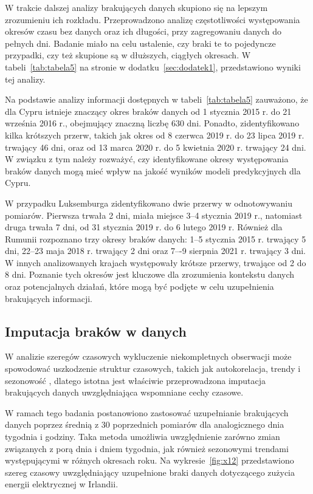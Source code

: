 \documentclass[polish, twoside, 12pt, a4paper]{article}
\theoremstyle{definition}
\theoremstyle{plain}
\theoremstyle{remark}
\begin{document}
W trakcie dalszej analizy brakujących danych skupiono się na lepszym zrozumieniu ich rozkładu. Przeprowadzono analizę częstotliwości występowania okresów czasu bez danych oraz ich długości, przy zagregowaniu danych do pełnych dni. Badanie miało na celu ustalenie, czy braki te to pojedyncze przypadki, czy też skupione są w dłuższych, ciągłych okresach. W tabeli~\ref{tab:tabela5} na stronie \pageref{tab:tabela5} w dodatku~\ref{sec:dodatek1}, przedstawiono wyniki tej analizy. 

Na podstawie analizy informacji dostępnych w tabeli~\ref{tab:tabela5} zauważono, że dla Cypru istnieje znaczący okres braków danych od 1 stycznia 2015 r. do 21 września 2016 r., obejmujący znaczną liczbę 630 dni. Ponadto, zidentyfikowano kilka krótszych przerw, takich jak okres od 8 czerwca 2019 r. do 23 lipca 2019 r. trwający 46 dni, oraz od 13 marca 2020 r. do 5 kwietnia 2020 r. trwający 24 dni. W związku z tym należy rozważyć, czy identyfikowane okresy występowania braków danych mogą mieć wpływ na jakość wyników modeli predykcyjnych dla Cypru.

W przypadku Luksemburga zidentyfikowano dwie przerwy w odnotowywaniu pomiarów. Pierwsza trwała 2 dni, miała miejsce 3--4 stycznia 2019 r., natomiast druga trwała 7 dni, od 31 stycznia 2019 r. do 6 lutego 2019 r. Również dla Rumunii rozpoznano trzy okresy braków danych: 1--5 stycznia 2015 r. trwający 5 dni, 22--23 maja 2018 r. trwający 2 dni oraz 7–-9 sierpnia 2021 r. trwający 3 dni. W innych analizowanych krajach występowały krótsze przerwy, trwające od 2 do 8 dni. Poznanie tych okresów jest kluczowe dla zrozumienia kontekstu danych oraz potencjalnych działań, które mogą być podjęte w celu uzupełnienia brakujących informacji.

\subsection{Imputacja braków w danych}

W analizie szeregów czasowych wykluczenie niekompletnych obserwacji może spowodować uszkodzenie struktur czasowych, takich jak autokorelacja, trendy i sezonowość \citep{box1994}, dlatego istotna jest właściwie przeprowadzona imputacja brakujących danych uwzględniająca wspomniane cechy czasowe. 

W ramach tego badania postanowiono zastosować uzupełnianie brakujących danych poprzez średnią z 30 poprzednich pomiarów dla analogicznego dnia tygodnia i godziny. Taka metoda umożliwia uwzględnienie zarówno zmian związanych z porą dnia i dniem tygodnia, jak również sezonowymi trendami występującymi w różnych okresach roku. Na wykresie~\ref{fig:x12} przedstawiono szereg czasowy uwzględniający uzupełnione braki danych dotyczącego zużycia energii elektrycznej w Irlandii.
\end{document}
